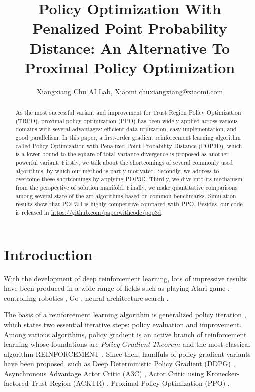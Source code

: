\documentclass{article}
\title{Policy Optimization With Penalized Point Probability Distance: An Alternative To Proximal Policy Optimization}
\author{
    Xiangxiang Chu
    \affiliations
    AI Lab, Xiaomi \emails
    chuxiangxiang@xiaomi.com
}
\begin{document}
\maketitle

\begin{abstract}
 As the most successful variant and improvement for Trust Region Policy Optimization (TRPO), proximal policy optimization (PPO) has been widely applied across various domains with several advantages: efficient data utilization, easy implementation, and good parallelism. In this paper, a first-order gradient reinforcement learning algorithm called Policy Optimization with Penalized Point Probability Distance (POP3D), which is a lower bound to the square of total variance divergence is proposed as another powerful variant. Firstly, we talk about the shortcomings of several commonly used algorithms, by which our method is partly motivated. Secondly, we address to overcome these shortcomings by applying POP3D. Thirdly, we dive into its mechanism from the perspective of solution manifold. Finally, we make quantitative comparisons among several state-of-the-art algorithms based on common benchmarks. Simulation results show that POP3D is highly competitive compared with PPO. Besides, our code is released in \url{https://github.com/paperwithcode/pop3d}.
  
\end{abstract}

\section{Introduction}

With the development of deep reinforcement learning, lots of impressive results have been produced in a wide range of fields such as playing Atari game \cite{mnih2015human,hessel2017rainbow},  controlling robotics \cite{lillicrap2015continuous}, Go \cite{silver2017mastering}, neural architecture search \cite{tan2018mnasnet,pham2018efficient}. 



The basis of a reinforcement learning algorithm is generalized policy iteration \cite{sutton2018reinforcement}, which states  two essential iterative steps: policy evaluation and improvement. Among various algorithms, policy gradient is an active branch of reinforcement learning whose foundations are  $Policy$ $Gradient$ $Theorem$ and the most classical  algorithm REINFORCEMENT \cite{sutton2018reinforcement}. Since then, handfuls of policy  gradient variants have been proposed, such as  Deep Deterministic Policy Gradient (DDPG) \cite{lillicrap2015continuous}, Asynchronous Advantage Actor Critic (A3C) \cite{2016arXiv160201783M}, Actor Critic using Kronecker-factored Trust Region (ACKTR) \cite{wu2017scalable}, Proximal Policy Optimization (PPO) \cite{2017arXiv170706347S}.
\end{document}
